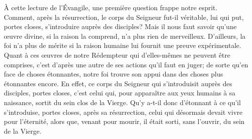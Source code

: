 À cette lecture de l’Évangile, une première question frappe notre esprit.
Comment, après la résurrection, le corps du Seigneur fut-il véritable,
	lui qui put, portes closes, s’introduire auprès des disciples?
Mais il nous faut savoir qu’une œuvre divine, si la raison la comprend,
	n’a plus rien de merveilleux.
D’ailleurs, la foi n’a plus de mérite
	si la raison humaine lui fournit une preuve expérimentale.
Quant à ces œuvres de notre Rédempteur
		qui d’elles-mêmes ne peuvent être comprises,
	c’est d’après une autre de ses actions qu’il faut en juger;
	de sorte qu’en face de choses étonnantes,
	notre foi trouve son appui dans des choses plus étonnantes encore.
En effet, ce corps du Seigneur
		qui s’introduisit auprès des disciples, portes closes,
	c’est celui qui, pour apparaître aux yeux humains à sa naissance,
	sortit du sein clos de la Vierge.
Qu’y a-t-il donc d’étonnant à ce qu’il s’introduise,
	portes closes, après sa résurrection,
	celui qui désormais devait vivre pour l’éternité,
	alors que, venant pour mourir,
	il était sorti, sans l’ouvrir, du sein de la Vierge.
